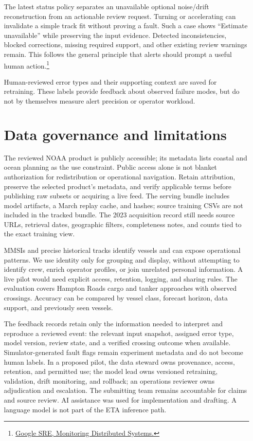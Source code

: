 \documentclass[11pt]{article}
\begin{document}
The latest status policy separates an unavailable optional noise/drift reconstruction from an actionable review request. Turning or accelerating can invalidate a simple track fit without proving a fault. Such a case shows ``Estimate unavailable'' while preserving the input evidence. Detected inconsistencies, blocked corrections, missing required support, and other existing review warnings remain. This follows the general principle that alerts should prompt a useful human action.\footnote{\href{https://sre.google/sre-book/monitoring-distributed-systems/}{Google SRE, Monitoring Distributed Systems.}}

Human-reviewed error types and their supporting context are saved for retraining. These labels provide feedback about observed failure modes, but do not by themselves measure alert precision or operator workload.

\section{Data governance and limitations}
The reviewed NOAA product is publicly accessible; its metadata lists coastal and ocean planning as the use constraint. Public access alone is not blanket authorization for redistribution or operational navigation. Retain attribution, preserve the selected product's metadata, and verify applicable terms before publishing raw subsets or acquiring a live feed. The serving bundle includes model artifacts, a March replay cache, and hashes; source training CSVs are not included in the tracked bundle. The 2023 acquisition record still needs source URLs, retrieval dates, geographic filters, completeness notes, and counts tied to the exact training view.

MMSIs and precise historical tracks identify vessels and can expose operational patterns. We use identity only for grouping and display, without attempting to identify crew, enrich operator profiles, or join unrelated personal information. A live pilot would need explicit access, retention, logging, and sharing rules. The evaluation covers Hampton Roads cargo and tanker approaches with observed crossings. Accuracy can be compared by vessel class, forecast horizon, data support, and previously seen vessels.

The feedback records retain only the information needed to interpret and reproduce a reviewed event: the relevant input snapshot, assigned error type, model version, review state, and a verified crossing outcome when available. Simulator-generated fault flags remain experiment metadata and do not become human labels. In a proposed pilot, the data steward owns provenance, access, retention, and permitted use; the model lead owns versioned retraining, validation, drift monitoring, and rollback; an operations reviewer owns adjudication and escalation. The submitting team remains accountable for claims and source review. AI assistance was used for implementation and drafting. A language model is not part of the ETA inference path.
\end{document}
